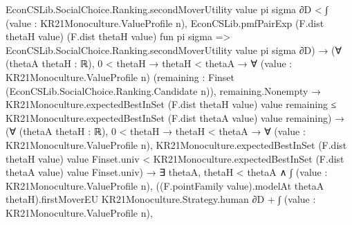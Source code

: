 \documentclass[10pt]{article}
\begin{document}
\begin{ReviewVerbatim}
                                                      EconCSLib.SocialChoice.Ranking.secondMoverUtility value pi
                                                        sigma ∂D <
                                                  ∫ (value : KR21Monoculture.ValueProfile n),
                                                    EconCSLib.pmfPairExp (F.dist thetaH value) (F.dist thetaH value)
                                                      fun pi sigma =>
                                                      EconCSLib.SocialChoice.Ranking.secondMoverUtility value pi
                                                        sigma ∂D) →
                                          (∀ (thetaA thetaH : ℝ),
                                              0 < thetaH →
                                                thetaH < thetaA →
                                                  ∀ (value : KR21Monoculture.ValueProfile n)
                                                    (remaining : Finset (EconCSLib.SocialChoice.Ranking.Candidate n)),
                                                    remaining.Nonempty →
                                                      KR21Monoculture.expectedBestInSet (F.dist thetaH value) value
                                                          remaining ≤
                                                        KR21Monoculture.expectedBestInSet (F.dist thetaA value) value
                                                          remaining) →
                                            (∀ (thetaA thetaH : ℝ),
                                                0 < thetaH →
                                                  thetaH < thetaA →
                                                    ∀ (value : KR21Monoculture.ValueProfile n),
                                                      KR21Monoculture.expectedBestInSet (F.dist thetaH value) value
                                                          Finset.univ <
                                                        KR21Monoculture.expectedBestInSet (F.dist thetaA value) value
                                                          Finset.univ) →
                                              ∃ thetaA,
                                                thetaH < thetaA ∧
                                                  ∫ (value : KR21Monoculture.ValueProfile n),
                                                          ((F.pointFamily value).modelAt thetaA thetaH).firstMoverEU
                                                            KR21Monoculture.Strategy.human ∂D +
                                                        ∫ (value : KR21Monoculture.ValueProfile n),

\end{ReviewVerbatim}
\end{document}
